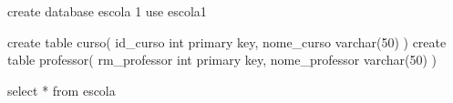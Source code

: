 create database escola 1
use escola1 

create table curso(
id_curso int primary key,
nome_curso varchar(50)
)
create table professor(
rm_professor int primary key,
nome_professor varchar(50)
)

select * from escola 